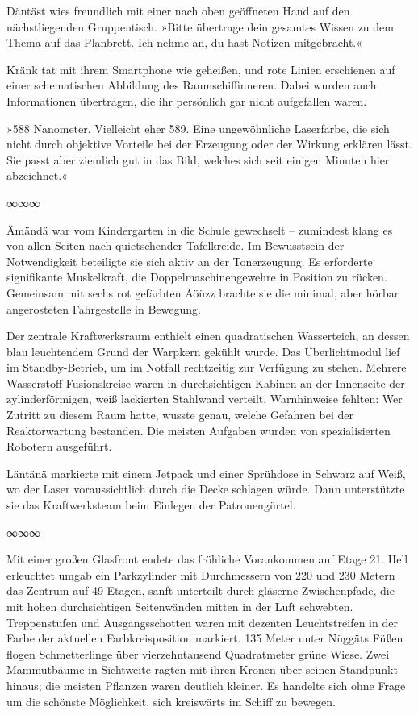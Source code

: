 Däntäst wies freundlich mit einer nach oben geöffneten Hand auf den nächstliegenden Gruppentisch. »Bitte übertrage dein gesamtes Wissen zu dem Thema auf das Planbrett. Ich nehme an, du hast Notizen mitgebracht.«

Kränk tat mit ihrem Smartphone wie geheißen, und rote Linien erschienen auf einer schematischen Abbildung des Raumschiffinneren. Dabei wurden auch Informationen übertragen, die ihr persönlich gar nicht aufgefallen waren.

»588 Nanometer. Vielleicht eher 589. Eine ungewöhnliche Laserfarbe, die sich nicht durch objektive Vorteile bei der Erzeugung oder der Wirkung erklären lässt. Sie passt aber ziemlich gut in das Bild, welches sich seit einigen Minuten hier abzeichnet.«

\begin{center}
	∞∞∞
\end{center}

Ämändä war vom Kindergarten in die Schule gewechselt – zumindest klang es von allen Seiten nach quietschender Tafelkreide. Im Bewusstsein der Notwendigkeit beteiligte sie sich aktiv an der Tonerzeugung. Es erforderte signifikante Muskelkraft, die Doppelmaschinengewehre in Position zu rücken. Gemeinsam mit sechs rot gefärbten Äöüzz brachte sie die minimal, aber hörbar angerosteten Fahrgestelle in Bewegung.

Der zentrale Kraftwerksraum enthielt einen quadratischen Wasserteich, an dessen blau leuchtendem Grund der Warpkern gekühlt wurde. Das Überlichtmodul lief im Standby-Betrieb, um im Notfall rechtzeitig zur Verfügung zu stehen. Mehrere Wasserstoff-Fusionskreise waren in durchsichtigen Kabinen an der Innenseite der zylinderförmigen, weiß lackierten Stahlwand verteilt. Warnhinweise fehlten: Wer Zutritt zu diesem Raum hatte, wusste genau, welche Gefahren bei der Reaktorwartung bestanden. Die meisten Aufgaben wurden von spezialisierten Robotern ausgeführt.

Läntänä markierte mit einem Jetpack und einer Sprühdose in Schwarz auf Weiß, wo der Laser voraussichtlich durch die Decke schlagen würde. Dann unterstützte sie das Kraftwerksteam beim Einlegen der Patronengürtel.

\begin{center}
	∞∞∞
\end{center}

Mit einer großen Glasfront endete das fröhliche Vorankommen auf Etage 21. Hell erleuchtet umgab ein Parkzylinder mit Durchmessern von 220 und 230 Metern das Zentrum auf 49 Etagen, sanft unterteilt durch gläserne Zwischenpfade, die mit hohen durchsichtigen Seitenwänden mitten in der Luft schwebten. Treppenstufen und Ausgangsschotten waren mit dezenten Leuchtstreifen in der Farbe der aktuellen Farbkreisposition markiert. 135 Meter unter Nüggäts Füßen flogen Schmetterlinge über vierzehntausend Quadratmeter grüne Wiese. Zwei Mammutbäume in Sichtweite ragten mit ihren Kronen über seinen Standpunkt hinaus; die meisten Pflanzen waren deutlich kleiner. Es handelte sich ohne Frage um die schönste Möglichkeit, sich kreiswärts im Schiff zu bewegen.

